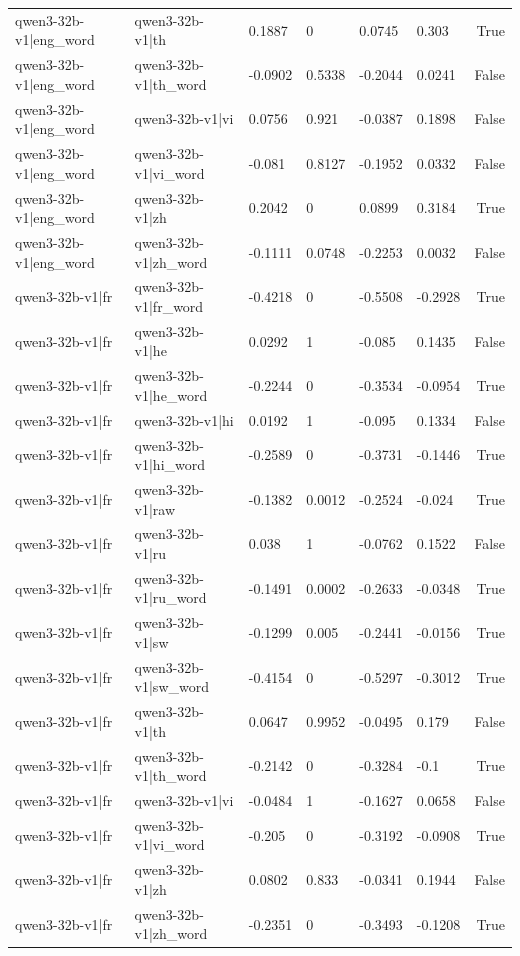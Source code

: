 \begin{table}
\begin{tabular}{llllllr}
qwen3-32b-v1|eng_word & qwen3-32b-v1|th & 0.1887 & 0 & 0.0745 & 0.303 & True \\
qwen3-32b-v1|eng_word & qwen3-32b-v1|th_word & -0.0902 & 0.5338 & -0.2044 & 0.0241 & False \\
qwen3-32b-v1|eng_word & qwen3-32b-v1|vi & 0.0756 & 0.921 & -0.0387 & 0.1898 & False \\
qwen3-32b-v1|eng_word & qwen3-32b-v1|vi_word & -0.081 & 0.8127 & -0.1952 & 0.0332 & False \\
qwen3-32b-v1|eng_word & qwen3-32b-v1|zh & 0.2042 & 0 & 0.0899 & 0.3184 & True \\
qwen3-32b-v1|eng_word & qwen3-32b-v1|zh_word & -0.1111 & 0.0748 & -0.2253 & 0.0032 & False \\
qwen3-32b-v1|fr & qwen3-32b-v1|fr_word & -0.4218 & 0 & -0.5508 & -0.2928 & True \\
qwen3-32b-v1|fr & qwen3-32b-v1|he & 0.0292 & 1 & -0.085 & 0.1435 & False \\
qwen3-32b-v1|fr & qwen3-32b-v1|he_word & -0.2244 & 0 & -0.3534 & -0.0954 & True \\
qwen3-32b-v1|fr & qwen3-32b-v1|hi & 0.0192 & 1 & -0.095 & 0.1334 & False \\
qwen3-32b-v1|fr & qwen3-32b-v1|hi_word & -0.2589 & 0 & -0.3731 & -0.1446 & True \\
qwen3-32b-v1|fr & qwen3-32b-v1|raw & -0.1382 & 0.0012 & -0.2524 & -0.024 & True \\
qwen3-32b-v1|fr & qwen3-32b-v1|ru & 0.038 & 1 & -0.0762 & 0.1522 & False \\
qwen3-32b-v1|fr & qwen3-32b-v1|ru_word & -0.1491 & 0.0002 & -0.2633 & -0.0348 & True \\
qwen3-32b-v1|fr & qwen3-32b-v1|sw & -0.1299 & 0.005 & -0.2441 & -0.0156 & True \\
qwen3-32b-v1|fr & qwen3-32b-v1|sw_word & -0.4154 & 0 & -0.5297 & -0.3012 & True \\
qwen3-32b-v1|fr & qwen3-32b-v1|th & 0.0647 & 0.9952 & -0.0495 & 0.179 & False \\
qwen3-32b-v1|fr & qwen3-32b-v1|th_word & -0.2142 & 0 & -0.3284 & -0.1 & True \\
qwen3-32b-v1|fr & qwen3-32b-v1|vi & -0.0484 & 1 & -0.1627 & 0.0658 & False \\
qwen3-32b-v1|fr & qwen3-32b-v1|vi_word & -0.205 & 0 & -0.3192 & -0.0908 & True \\
qwen3-32b-v1|fr & qwen3-32b-v1|zh & 0.0802 & 0.833 & -0.0341 & 0.1944 & False \\
qwen3-32b-v1|fr & qwen3-32b-v1|zh_word & -0.2351 & 0 & -0.3493 & -0.1208 & True \\

\end{tabular}
\end{table}
